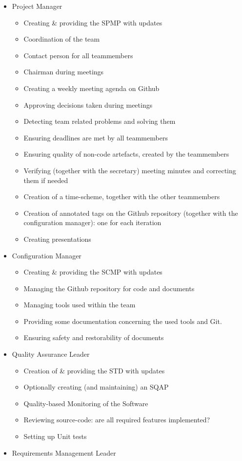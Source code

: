 \documentclass[12pt]{article}
\begin{document}
\begin{itemize}
\itemsep1pt\parskip0pt
\item
  Project Manager

  \begin{itemize}
  \itemsep1pt\parskip0pt
  \item
    Creating \& providing the SPMP with updates
  \item
    Coordination of the team
  \item
    Contact person for all teammembers
  \item
    Chairman during meetings
  \item
    Creating a weekly meeting agenda on Github
  \item
    Approving decisions taken during meetings
  \item
    Detecting team related problems and solving them
  \item
    Ensuring deadlines are met by all teammembers
  \item
    Ensuring quality of non-code artefacts, created by the teammembers
  \item
    Verifying (together with the secretary) meeting minutes and
    correcting them if needed
  \item
    Creation of a time-scheme, together with the other teammembers
  \item
    Creation of annotated tags on the Github repository (together with
    the configuration manager): one for each iteration
  \item
    Creating presentations
  \end{itemize}
\item
  Configuration Manager

  \begin{itemize}
  \itemsep1pt\parskip0pt
  \item
    Creating \& providing the SCMP with updates
  \item
    Managing the Github repository for code and
    documents
  \item
    Managing tools used within the team
  \item
    Providing some documentation concerning the used tools and Git.
  \item
    Ensuring safety and restorability of documents
  \end{itemize}
\item
  Quality Assurance Leader

  \begin{itemize}
  \itemsep1pt\parskip0pt
  \item
    Creation of \& providing the STD with updates
  \item
    Optionally creating (and maintaining) an SQAP
  \item
    Quality-based Monitoring of the Software
  \item
    Reviewing source-code: are all required features implemented?
  \item
    Setting up Unit tests
  \end{itemize}
\item
  Requirements Management Leader


\end{itemize}
\end{document}
